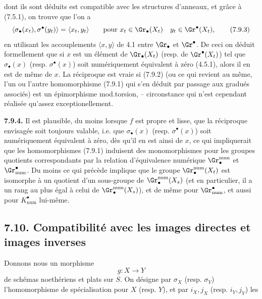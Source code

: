dont ils sont déduits est compatible avec les structures d'anneaux, et grâce à (7.5.1), on trouve que l'on a
\[
  \langle\sigma_\bullet(x_t),\sigma^\bullet(y_t)\rangle
  =
  \langle x_t,y_t\rangle
  \qquad\text{pour }
  x_t\in\Gr_\bullet(X_t)\quad y_t\in\Gr^\bullet(X_t),
\tag{7.9.3}
\]
en utilisant les accouplements \(\langle x,y\rangle\) de 4.1 entre \(\Gr_\bullet\) et \(\Gr^\bullet\). De ceci on déduit formellement que si \(x\) est un élément de \(\Gr_\bullet(X_t)\) (resp. de \(\Gr^\bullet(X_t)\)) tel que \(\sigma_\bullet(x)\) (resp. \(\sigma^\bullet(x)\)) soit numériquement équivalent à zéro (4.5.1), alors il en est de même de \(x\). La réciproque est vraie si (7.9.2) (ou ce qui revient au même, l'un ou l'autre homomorphisme (7.9.1) qui s'en déduit par passage aux gradués associés) est un épimorphisme mod.torsion, -- circonstance qui n'est cependant réalisée qu'assez exceptionellement.

\textbf{7.9.4.} Il est plausible, du moins lorsque \(f\) est propre et lisse, que la réciproque envisagée soit toujours valable, i.e. que \(\sigma_\bullet(x)\) (resp. \(\sigma^\bullet(x)\)) soit numériquement équivalent à zéro, dès qu'il en est ainsi de \(x\), ce qui impliquerait que les homomorphismes (7.9.1) induisent des monomorphismes pour les groupes quotients correspondants par la relation d'équivalence numérique \(\Gr^{\mathrm{num}}_\bullet\) et \(\Gr_{\mathrm{num}}^\bullet\). Du moins ce qui précède implique que le groupe \(\Gr_\bullet^{\mathrm{num}}(X_t)\) est isomorphe à un quotient d'un sous-groupe de \(\Gr_\bullet^{\mathrm{num}}(X_s)\) (et en particulier, il a un rang au plus égal à celui de \(\Gr_\bullet^{\mathrm{num}}(X_s)\)), et de même pour \(\Gr_{\mathrm{num}}^\bullet\), et aussi pour \(K^\bullet_{\mathrm{num}}\) lui-même.

\subsection*{7.10. Compatibilité avec les images directes et images inverses}
Donnons nous un morphisme
\[
  g:X\longrightarrow Y
\]
de schémas noethériens et plats sur \(S\). On désigne par \(\sigma_X\) (resp. \(\sigma_Y\)) l'homomorphisme de spécialisation pour \(X\) (resp. \(Y\)), et par \(i_X,j_X\) (resp. \(i_Y,j_Y\)) les
